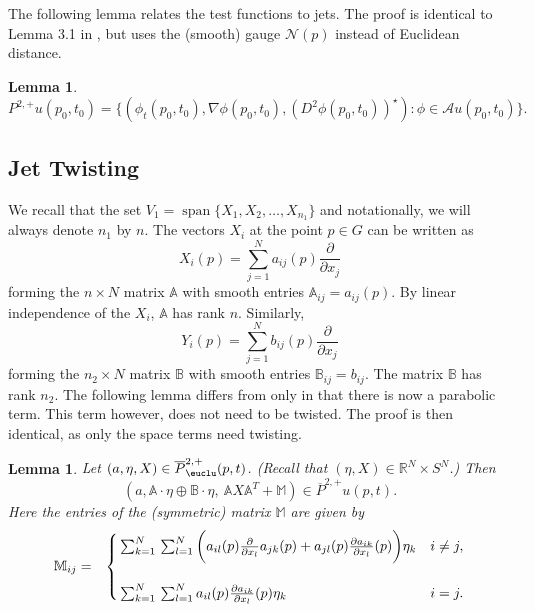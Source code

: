 \documentclass[12pt]{amsart}
\newtheorem{lemma}[thm]{Lemma}
\theoremstyle{definition}
\theoremstyle{remark}
\numberwithin{equation}{section}
\begin{document}
The following lemma relates the test functions to jets. The proof is identical to Lemma 3.1 in \cite{B:HP}, but uses the (smooth) gauge $\mathcal{N}(p)$ instead of Euclidean distance.
\begin{lemma}
$$P^{2,+}u(p_0,t_0)=\{(\phi_t(p_0,t_0),\nabla \phi(p_0,t_0), (D^2\phi(p_0,t_0))^\star): \phi \in \mathcal{A}u(p_0,t_0)\}.$$ 
\end{lemma}

\subsection{Jet Twisting}
We recall that the set $V_1={\operatorname{span}} \{X_1,X_2,\ldots, X_{n_1}\}$ and notationally, we will always denote $n_1$ by $n$. The vectors $X_i$ at the point $p\in G$ can be written as 
$$X_i(p)=\sum_{j=1}^N a_{ij}(p)\frac{\partial}{{\partial} x_j}$$
forming the $n\times N$ matrix $\mathbb{A}$ with smooth entries $\mathbb{A}_{ij}=a_{ij}(p)$. By linear independence of the $X_i$, $\mathbb{A}$ has rank $n$. Similarly, $$Y_i(p)=
\sum_{j=1}^N b_{ij}(p)\frac{\partial}{{\partial} x_j}$$ forming the $n_2 \times N$ matrix $\mathbb{B}$ with smooth entries $\mathbb{B}_{ij}=b_{ij}$. The matrix $\mathbb{B}$ has rank $n_2$. 
The following lemma differs from \cite[Corollary 3.2]{B:MP} only in that there is now a parabolic term. This term however, does not need to be twisted. The proof is then identical, as only the space terms need twisting.  
\begin{lemma}\label{twist}
Let $(a,\eta, X) \in \overline{P}^{2,+}_\euclu(p,t)$. (Recall that $(\eta,X) \in \mathbb{R}^N \times S^N$.)  Then $$(a, \mathbb{A} \cdot \eta \oplus \mathbb{B} \cdot \eta, \  
\mathbb{A}X\mathbb{A}^T+\mathbb{M}) \in \overline{P}^{2,+}u(p,t).$$ Here the entries of the (symmetric) matrix $\mathbb{M}$ are given by 
\begin{eqnarray*}
 \mathbb{M}_{ij} & = &\begin{cases}
  {\displaystyle} \sum_{k=1}^N{\displaystyle}\sum_{l=1}^N \bigg(a_{il}(p)\frac{{\displaystyle}{\partial}}{{\displaystyle}{\partial} x_l}a_{jk}(p)+a_{jl}(p)\frac{{\displaystyle}{\partial} a_{ik}}{{\displaystyle}{\partial} x_l}(p)\bigg)\eta_k     & i \neq j, \\
    & \\
  {\displaystyle}\sum_{k=1}^N{\displaystyle}\sum_{l=1}^N a_{il}(p)\frac{{\displaystyle}{\partial} a_{ik}}{{\displaystyle}{\partial} x_l}(p)\eta_k    & i = j.
\end{cases}
\end{eqnarray*}
\end{lemma}
\end{document}
